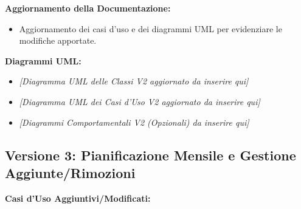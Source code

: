\documentclass[a4paper,12pt]{article}
\begin{document}
    \bigskip
    \textbf{Aggiornamento della Documentazione:}
    \begin{itemize}
        \item Aggiornamento dei casi d’uso e dei diagrammi UML per evidenziare le modifiche apportate.
    \end{itemize}

    \bigskip
    \textbf{Diagrammi UML:}
    \begin{itemize}
        \item \textit{[Diagramma UML delle Classi V2 aggiornato da inserire qui]}
        \item \textit{[Diagramma UML dei Casi d'Uso V2 aggiornato da inserire qui]}
        \item \textit{[Diagrammi Comportamentali V2 (Opzionali) da inserire qui]}
    \end{itemize}

    \newpage

    \subsection{Versione 3: Pianificazione Mensile e Gestione Aggiunte/Rimozioni}
    \textbf{Casi d'Uso Aggiuntivi/Modificati:}
\end{document}
